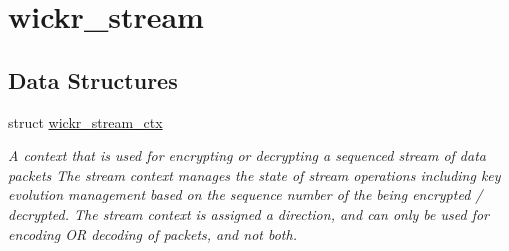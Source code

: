 \hypertarget{group__wickr__stream}{}\section{wickr\+\_\+stream}
\label{group__wickr__stream}
\subsection*{Data Structures}
\begin{DoxyCompactItemize}
\item 
struct \hyperlink{structwickr__stream__ctx}{wickr\+\_\+stream\+\_\+ctx}
\begin{DoxyCompactList}\small\item\em A context that is used for encrypting or decrypting a sequenced stream of data packets The stream context manages the state of stream operations including key evolution management based on the sequence number of the being encrypted / decrypted. The stream context is assigned a direction, and can only be used for encoding OR decoding of packets, and not both. \end{DoxyCompactList}\end{DoxyCompactItemize}
